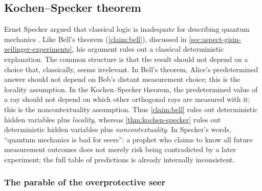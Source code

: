 \subsection{Kochen--Specker theorem}\label{sec:ernst-specker}

Ernst Specker argued that classical logic is inadequate for describing quantum mechanics
\cite{speckerLogikNichtGleichzeitigEntscheidbarerAussagen}.
Like Bell's theorem (\autoref{claim:bell}), discussed in \autoref{sec:aspect-gisin-zeilinger-experiments}, his argument rules out a classical deterministic explanation.
The common structure is that the result should not depend on a choice that, classically, seems irrelevant.
In Bell's theorem, Alice's predetermined answer should not depend on Bob's distant measurement choice; this is the locality assumption.
In the Kochen--Specker theorem, the predetermined value of a ray should not depend on which other orthogonal rays are measured with it; this is the noncontextuality assumption.
Thus \autoref{claim:bell} rules out deterministic hidden variables plus \emph{locality}, whereas \autoref{thm:kochen-specker} rules out deterministic hidden variables plus \emph{noncontextuality}.
In Specker's words, ``quantum mechanics is bad for seers'': 
a prophet who claims to know all future measurement outcomes does not merely risk being contradicted by a later experiment; 
the full table of predictions is already internally inconsistent.

\subsubsection*{The parable of the overprotective seer}

